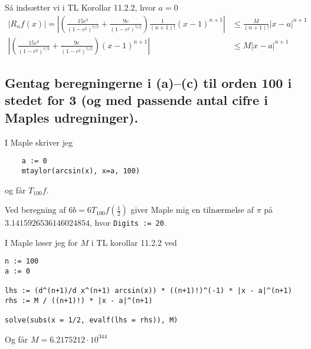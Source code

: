 \documentclass[11pt,a4paper]{article}
\newcommand{\modulus}[1]{\left|#1\right|}
\newcommand{\half}{\frac{1}{2}}
\begin{document}
Så indsætter vi i TL Korollar 11.2.2, hvor $a = 0$
\begin{align}
    \modulus{R_n f(x)} =
    \modulus{
        \left( \frac{15c^3}{(1 - c^2)^{7/2}} +
               \frac{9c}{(1 - c^2)^{5/2}}
        \right)
        \frac{1}{(n + 1)!} (x - 1)^{n+1}}
    &\leq
    \frac{M}{(n + 1)!} \modulus{x - a}^{n+1}
    \\
    \modulus{
        \left( \frac{15c^3}{(1 - c^2)^{7/2}} +
               \frac{9c}{(1 - c^2)^{5/2}}
        \right)
        (x - 1)^{n+1}}
    &\leq
    M \modulus{x - a}^{n+1}
\end{align}
\fi

\subsection
{
    \mdseries
    Gentag beregningerne i (a)--(c) til orden 100 i stedet for 3 (og med
    passende antal cifre i Maples udregninger).
}

\begin{multicols}{2}
    I Maple skriver jeg
    \begin{lstlisting}
    a := 0
    mtaylor(arcsin(x), x=a, 100)
    \end{lstlisting}
    og får $T_{100} f$.

    Ved beregning af $6b = 6 T_{100} f(\half)$ giver Maple mig en tilnærmelse
    af $\pi$ på $3.1415926536146024854$, hvor {\tt Digits := 20}.

    I Maple løser jeg for $M$ i TL korollar 11.2.2 ved
\begin{lstlisting}
n := 100
a := 0

lhs := (d^(n+1)/d x^(n+1) arcsin(x)) * ((n+1)!)^(-1) * |x - a|^(n+1)
rhs := M / ((n+1)!) * |x - a|^(n+1)

solve(subs(x = 1/2, evalf(lhs = rhs)), M)
\end{lstlisting}
Og får $M = 6.2175212 \cdot 10^{344}$

\end{multicols}
\end{document}
